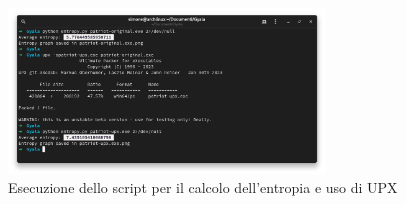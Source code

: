 \begin{figure}[htbp]
    \centering
    \includegraphics[width=0.75\textwidth]{assets/entropy_script_terminal.png}
    \caption{Esecuzione dello script per il calcolo dell'entropia e uso di UPX}
    \label{fig:entropy_script_terminal}
\end{figure}

